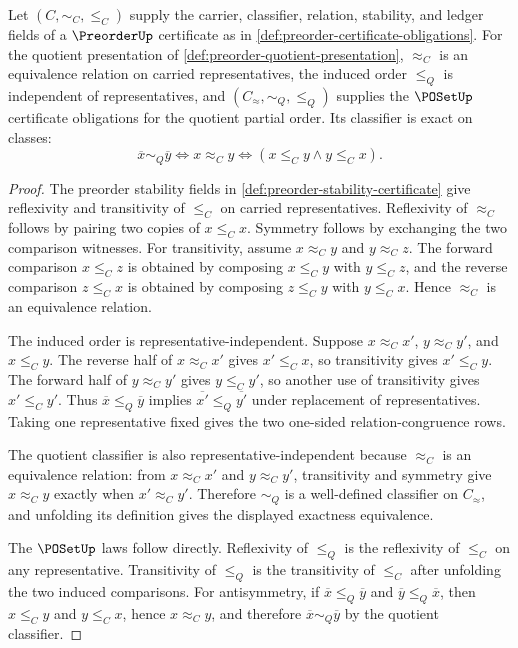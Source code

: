 \begin{theorem}
\label{thm:preorder-quotient-yields-poset}
Let $(C,\sim_C,\le_C)$ supply the carrier, classifier, relation, stability, and ledger fields of a $\PreorderUp$ certificate as in \autoref{def:preorder-certificate-obligations}. For the quotient presentation of \autoref{def:preorder-quotient-presentation}, $\approx_C$ is an equivalence relation on carried representatives, the induced order $\le_Q$ is independent of representatives, and $(C_{\!\approx},\sim_Q,\le_Q)$ supplies the $\POSetUp$ certificate obligations for the quotient partial order. Its classifier is exact on classes:
$$
\overline{x}\sim_Q\overline{y}
\Leftrightarrow
x\approx_C y
\Leftrightarrow
(x\le_C y\land y\le_C x).
$$
\end{theorem}
\begin{proof}
The preorder stability fields in \autoref{def:preorder-stability-certificate} give reflexivity and transitivity of $\le_C$ on carried representatives. Reflexivity of $\approx_C$ follows by pairing two copies of $x\le_C x$. Symmetry follows by exchanging the two comparison witnesses. For transitivity, assume $x\approx_C y$ and $y\approx_C z$. The forward comparison $x\le_C z$ is obtained by composing $x\le_C y$ with $y\le_C z$, and the reverse comparison $z\le_C x$ is obtained by composing $z\le_C y$ with $y\le_C x$. Hence $\approx_C$ is an equivalence relation.

The induced order is representative-independent. Suppose $x\approx_C x'$, $y\approx_C y'$, and $x\le_C y$. The reverse half of $x\approx_C x'$ gives $x'\le_C x$, so transitivity gives $x'\le_C y$. The forward half of $y\approx_C y'$ gives $y\le_C y'$, so another use of transitivity gives $x'\le_C y'$. Thus $\overline{x}\le_Q\overline{y}$ implies $\overline{x'}\le_Q\overline{y'}$ under replacement of representatives. Taking one representative fixed gives the two one-sided relation-congruence rows.

The quotient classifier is also representative-independent because $\approx_C$ is an equivalence relation: from $x\approx_C x'$ and $y\approx_C y'$, transitivity and symmetry give $x\approx_C y$ exactly when $x'\approx_C y'$. Therefore $\sim_Q$ is a well-defined classifier on $C_{\!\approx}$, and unfolding its definition gives the displayed exactness equivalence.

The $\POSetUp$ laws follow directly. Reflexivity of $\le_Q$ is the reflexivity of $\le_C$ on any representative. Transitivity of $\le_Q$ is the transitivity of $\le_C$ after unfolding the two induced comparisons. For antisymmetry, if $\overline{x}\le_Q\overline{y}$ and $\overline{y}\le_Q\overline{x}$, then $x\le_C y$ and $y\le_C x$, hence $x\approx_C y$, and therefore $\overline{x}\sim_Q\overline{y}$ by the quotient classifier.


\end{proof}
